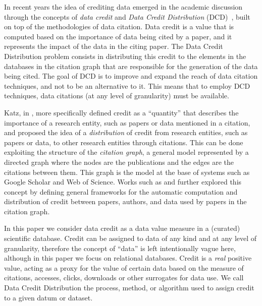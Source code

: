 In recent years the idea of crediting data emerged in the academic discussion through the concepts of \emph{data credit} and \emph{Data Credit Distribution} (DCD)~\citep{creditFang18,transitiveCreditKatz2014,zeng2020assigning}, built on top of the methodologies of data citation. 
Data credit is a value that is computed based on the importance of data being cited by a paper, and it represents the impact of the data in the citing paper. 
The Data Credit Distribution problem consists in distributing this credit to the elements in the databases in the citation graph that are responsible for the generation of the data being cited. The goal of DCD is to improve and expand the reach of data citation techniques, and not to be an alternative to it. This means that to employ DCD techniques, data citations (at any level of granularity) must be available.

Katz, in \citep{katz2020SoftwareandData}, more specifically defined credit as a ``quantity'' that describes the importance of a research entity, such as papers or data mentioned in a citation, and proposed the idea of a \emph{distribution} of credit from research entities, such as papers or data, to other research entities through citations. 
This can be done exploiting the structure of the \emph{citation graph}, a general model represented by a directed graph where the nodes are the publications and the edges are the citations between them.
This graph is the model at the base of systems such as Google Scholar and Web of Science.
Works such as \citep{zeng2020assigning} and \citep{creditFang18} further explored this concept by defining general frameworks for the automatic computation and distribution of credit between papers, authors, and data used by papers in the citation graph. 

In this paper we consider data credit as a data value measure in a (curated) scientific database. Credit can be assigned to data of any kind and at any level of granularity, therefore the concept of ``data'' is left intentionally vague here, although in this paper we focus on relational databases.
Credit is a \emph{real} positive value, acting as a proxy for the value of certain data based on the measure of citations, accesses, clicks, downloads or other surrogates for data use. We call Data Credit Distribution the process, method, or algorithm used to assign credit to a given datum or dataset.

